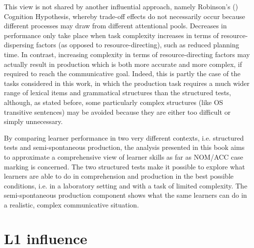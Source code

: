 This view is not shared by another influential approach, namely Robinson’s (\citeyear{Robinson2001, Robinson2005, Robinson2015}) Cognition Hypothesis, whereby trade-off effects do not necessarily occur because different processes may draw from different attentional pools. Decreases in performance only take place when task complexity increases in terms of resource-dispersing factors (as opposed to resource-directing), such as reduced planning time. In contrast, increasing complexity in terms of resource-directing factors may actually result in production which is both more accurate and more complex, if required to reach the communicative goal. Indeed, this is partly the case of the tasks considered in this work, in which the production task requires a much wider range of lexical items and grammatical structures than the structured tests, although, as stated before, some particularly complex structures (like OS transitive sentences) may be avoided because they are either too difficult or simply unnecessary. 

By comparing learner performance in two very different contexts, i.e. structured tests and semi-spontaneous production, the analysis presented in this book aims to approximate a comprehensive view of learner skills as far as NOM/ACC case marking is concerned. The two structured tests make it possible to explore what learners are able to do in comprehension and production in the best possible conditions, i.e. in a laboratory setting and with a task of limited complexity. The semi-spontaneous production component shows what the same learners can do in a realistic, complex communicative situation.

\section{L1 influence}\label{sec:01:3}

